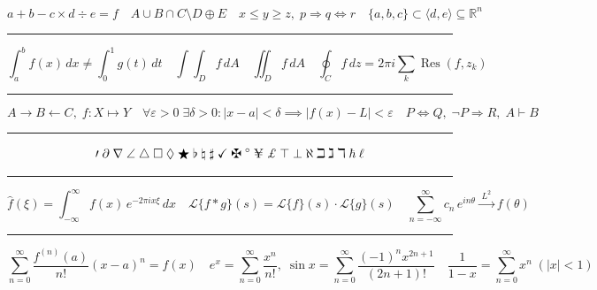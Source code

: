 \documentclass[10pt,a4paper,fleqn]{article}
\newcommand{\secdiv}{%
  \par\nobreak\vspace{1pt}%
  \noindent\rule{\linewidth}{0.5pt}%
  \par\nobreak\vspace{1pt}%
}
\begin{document}
\[
  a+b-c\times d\div e=f
  \quad
  A\cup B\cap C\setminus D\oplus E
  \quad
  x\leq y\geq z,\;p\Rightarrow q\iff r
  \quad
  \{a,b,c\}\subset\langle d,e\rangle\subseteq\mathbb{R}^n
\]
\secdiv

\[
  \int_a^b f(x)\,dx\ne\int_0^1 g(t)\,dt
  \quad
  \int\!\!\int_D f\,dA\quad\iint_D f\,dA
  \quad
  \oint_C f\,dz=2\pi i\sum_k\operatorname{Res}(f,z_k)
\]
\secdiv

\[
  A\to B\leftarrow C,\;f\colon X\mapsto Y
  \quad
  \forall\varepsilon>0\;\exists\delta>0\colon
    |x-a|<\delta\implies|f(x)-L|<\varepsilon
  \quad
  P\Leftrightarrow Q,\;\neg P\Rightarrow R,\;A\vdash B
\]
\secdiv

\[
  {\prime}\;\partial\;\nabla\;\angle\;\triangle\;\square\;\lozenge\;\bigstar\;
  \flat\;\natural\;\sharp\;\checkmark\;\maltese\;\degree\;\yen\;\pounds\;
  \top\;\bot\;\aleph\;\beth\;\gimel\;\daleth\;\hbar\;\ell
\]
\secdiv

\[
  \hat{f}(\xi)=\int_{-\infty}^{\infty}f(x)\,e^{-2\pi ix\xi}\,dx
  \quad
  \mathcal{L}\{f*g\}(s)=\mathcal{L}\{f\}(s)\cdot\mathcal{L}\{g\}(s)
  \quad
  \sum_{n=-\infty}^{\infty}c_n\,e^{in\theta}\xrightarrow{\;L^2\;}f(\theta)
\]
\secdiv

\[
  \sum_{n=0}^{\infty}\frac{f^{(n)}(a)}{n!}(x-a)^n=f(x)
  \quad
  e^x=\sum_{n=0}^{\infty}\frac{x^n}{n!},\;
  \sin x=\sum_{n=0}^{\infty}\frac{(-1)^n x^{2n+1}}{(2n+1)!}
  \quad
  \frac{1}{1-x}=\sum_{n=0}^{\infty}x^n\;(|x|<1)
\]
\end{document}
